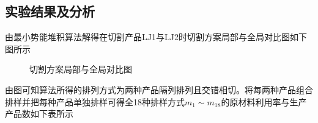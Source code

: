 \documentclass{whutmod}
\begin{document}
        \subsection{实验结果及分析}
        由最小势能堆积算法解得在切割产品LJ1与LJ2时切割方案局部与全局对比图如下图所示
        		\begin{figure}[H]
        	\centering
        	\caption{切割方案局部与全局对比图}\label{asdfsdf}
        \end{figure}
        由图可知算法所得的排列方式为两种产品隔列排列且交错相切。将每两种产品组合排样并把每种产品单独排样可得全18种排样方式$m_1\sim m_{18}$的原材料利用率与生产产品数如下表所示
\end{document}
